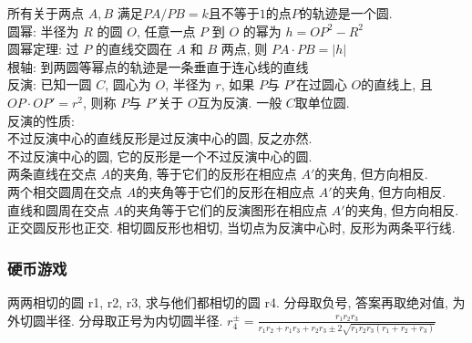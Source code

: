 \noindent 所有关于两点 $A,B$ 满足$PA/PB=k$且不等于$1$的点$P$的轨迹是一个圆.\\
圆幂: 半径为 $R$ 的圆 $O$, 任意一点 $P$ 到 $O$ 的幂为 $h=OP^2-R^2$\\
圆幂定理: 过 $P$ 的直线交圆在 $A$ 和 $B$ 两点, 则 $PA\cdot PB=|h|$\\
根轴: 到两圆等幂点的轨迹是一条垂直于连心线的直线\\
反演: 已知一圆 $C$, 圆心为 $O$, 半径为 $r$, 如果 $P$与 $P'$在过圆心 $O$的直线上, 且 $OP\cdot OP'=r^2$, 则称 $P$与 $P'$关于 $O$互为反演. 一般 $C$取单位圆.\\
反演的性质: \\
不过反演中心的直线反形是过反演中心的圆, 反之亦然.\\
不过反演中心的圆, 它的反形是一个不过反演中心的圆.\\
两条直线在交点 $A$的夹角, 等于它们的反形在相应点 $A'$的夹角, 但方向相反.\\
两个相交圆周在交点 $A$的夹角等于它们的反形在相应点 $A'$的夹角, 但方向相反.\\
直线和圆周在交点 $A$的夹角等于它们的反演图形在相应点 $A'$的夹角, 但方向相反.\\
正交圆反形也正交. 相切圆反形也相切, 当切点为反演中心时, 反形为两条平行线.
\subsubsection*{硬币游戏}
两两相切的圆 r1, r2, r3, 求与他们都相切的圆 r4.
分母取负号, 答案再取绝对值, 为外切圆半径.
分母取正号为内切圆半径.
$ r^{\pm}_4 = \frac{r_1 r_2 r_3}{r_1 r_2 + r_1 r_3 + r_2 r_3 \pm 2\sqrt{r_1r_2r_3(r_1 + r_2 + r_3)}} $
